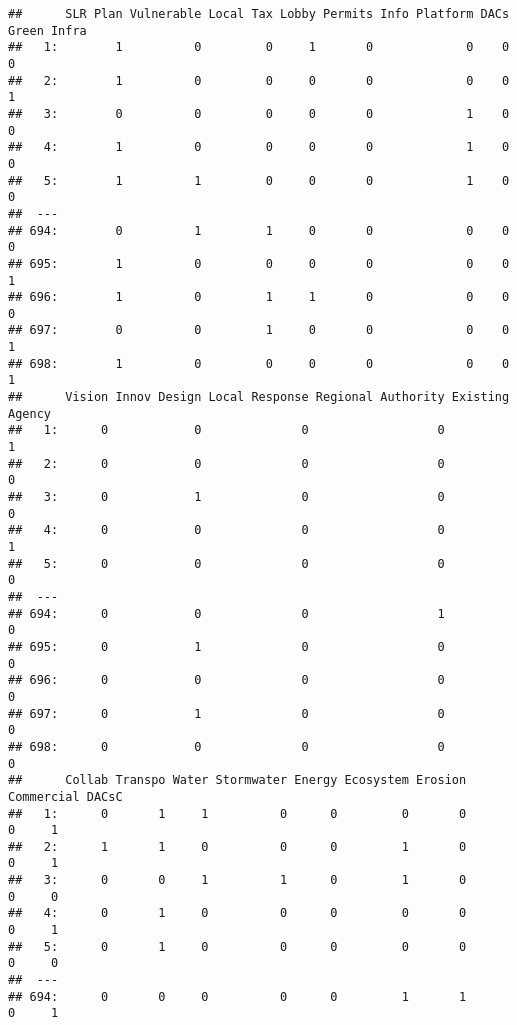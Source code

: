 \documentclass[
]{article}
\begin{document}
\begin{verbatim}
##      SLR Plan Vulnerable Local Tax Lobby Permits Info Platform DACs Green Infra
##   1:        1          0         0     1       0             0    0           0
##   2:        1          0         0     0       0             0    0           1
##   3:        0          0         0     0       0             1    0           0
##   4:        1          0         0     0       0             1    0           0
##   5:        1          1         0     0       0             1    0           0
##  ---                                                                           
## 694:        0          1         1     0       0             0    0           0
## 695:        1          0         0     0       0             0    0           1
## 696:        1          0         1     1       0             0    0           0
## 697:        0          0         1     0       0             0    0           1
## 698:        1          0         0     0       0             0    0           1
##      Vision Innov Design Local Response Regional Authority Existing Agency
##   1:      0            0              0                  0               1
##   2:      0            0              0                  0               0
##   3:      0            1              0                  0               0
##   4:      0            0              0                  0               1
##   5:      0            0              0                  0               0
##  ---                                                                      
## 694:      0            0              0                  1               0
## 695:      0            1              0                  0               0
## 696:      0            0              0                  0               0
## 697:      0            1              0                  0               0
## 698:      0            0              0                  0               0
##      Collab Transpo Water Stormwater Energy Ecosystem Erosion Commercial DACsC
##   1:      0       1     1          0      0         0       0          0     1
##   2:      1       1     0          0      0         1       0          0     1
##   3:      0       0     1          1      0         1       0          0     0
##   4:      0       1     0          0      0         0       0          0     1
##   5:      0       1     0          0      0         0       0          0     0
##  ---                                                                          
## 694:      0       0     0          0      0         1       1          0     1

\end{verbatim}
\end{document}
